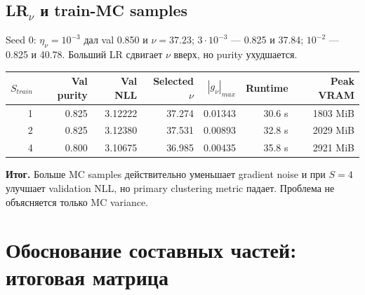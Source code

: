 \documentclass[11pt,a4paper]{article}
\newcommand{\boxnote}[2]{%
  \begin{center}\setlength{\fboxsep}{9pt}%
  \colorbox{#1}{\begin{minipage}{0.94\textwidth}\raggedright #2\par\end{minipage}}
  \end{center}}
\newcommand{\verdict}[1]{\boxnote{lightred}{\textbf{Итог.} #1}}
\begin{document}
\subsection{\texorpdfstring{LR$_\nu$}{LR-nu} и train-MC samples}

Seed 0: $\eta_\nu=10^{-3}$ дал val 0.850 и $\nu=37.23$;
$3\cdot10^{-3}$ --- 0.825 и 37.84; $10^{-2}$ --- 0.825 и 40.78. Больший LR
сдвигает $\nu$ вверх, но purity ухудшается.

\begin{center}
\begin{tabular}{rrrrrrr}
\toprule
$S_{train}$ & Val purity & Val NLL & Selected $\nu$ & $|g_\nu|_{max}$ & Runtime & Peak VRAM \\
\midrule
1 & 0.825 & 3.12222 & 37.274 & 0.01343 & 30.6 s & 1803 MiB \\
2 & 0.825 & 3.12380 & 37.531 & 0.00893 & 32.8 s & 2029 MiB \\
4 & 0.800 & 3.10675 & 36.985 & 0.00435 & 35.8 s & 2921 MiB \\
\bottomrule
\end{tabular}
\end{center}

\verdict{Больше MC samples действительно уменьшает gradient noise и при
$S=4$ улучшает validation NLL, но primary clustering metric падает. Проблема не
объясняется только MC variance.}

\section{Обоснование составных частей: итоговая матрица}
\end{document}
